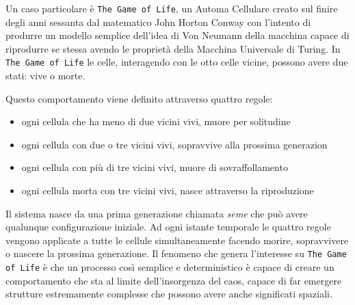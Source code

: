 \par
Un caso particolare è \texttt{The Game of Life}, un Automa Cellulare creato sul finire degli anni sessanta dal matematico John Horton Conway con l’intento di produrre un modello semplice dell’idea di Von Neumann della macchina capace di riprodurre se stessa avendo le proprietà della Macchina Universale di Turing. In \texttt{The Game of Life} le celle, interagendo con le otto celle vicine, possono avere due stati: vive o morte.
\par
Questo comportamento viene definito attraverso quattro regole:
\begin{itemize}
\item ogni cellula che ha meno di due vicini vivi, muore per solitudine
\item ogni cellula con due o tre vicini vivi, sopravvive alla prossima generazion
\item ogni cellula con più di tre vicini vivi, muore di sovraffollamento
\item ogni cellula morta con tre vicini vivi, nasce attraverso la riproduzione
\end{itemize}
\par
Il sistema nasce da una prima generazione chiamata \textit{seme} che può avere qualunque configurazione iniziale. Ad ogni istante temporale le quattro regole vengono applicate a tutte le cellule simultaneamente facendo morire, sopravvivere o nascere la prossima generazione. Il fenomeno che genera l’interesse su \texttt{The Game of Life} è che un processo così semplice e deterministico è capace di creare un comportamento che sta al limite dell’insorgenza del caos, capace di far emergere strutture estremamente complesse che possono avere anche significati spaziali.
